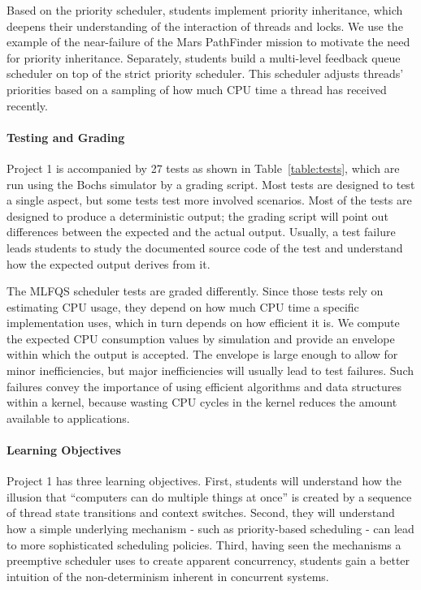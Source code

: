Based on the priority scheduler, students implement priority inheritance, 
which deepens their understanding of the interaction of threads and locks.
We use the example of the near-failure of the Mars PathFinder mission to motivate
the need for priority inheritance.  
Separately, students build a multi-level feedback queue scheduler on top of the strict
priority scheduler.  This scheduler adjusts threads' priorities based on a sampling  
of how much CPU time a thread has received recently.

\paragraph{Testing and Grading}
Project 1 is accompanied by 27 tests as shown in Table~\ref{table:tests}, which are 
run using the Bochs simulator by a grading script.  
Most tests are designed to test a single aspect, but some tests 
test more involved scenarios.  Most of the tests are designed to produce a deterministic 
output; the grading script will point out differences between the expected and the actual output. 
Usually, a test failure leads students to study the documented source code of the test
and understand how the expected output derives from it.

The MLFQS scheduler tests are graded differently. Since those tests rely on estimating CPU
usage, they depend on how much CPU time a specific implementation uses, which in turn depends on how
efficient it is.  We compute the expected CPU consumption values by simulation and provide an
envelope within which the output is accepted.  The envelope is large enough to allow for minor
inefficiencies, but major inefficiencies will usually lead to test failures.  Such failures
convey the importance of using efficient algorithms and data structures within a kernel,
because wasting CPU cycles in the kernel reduces the amount available to applications.

\paragraph{Learning Objectives}
Project 1 has three learning objectives.  First, students will understand how
the illusion that ``computers can do multiple things at once'' is created by a sequence
of thread state transitions and context switches.  Second, they will understand how
a simple underlying mechanism - such as priority-based scheduling - can lead to more
sophisticated scheduling policies.  Third, having seen the mechanisms a preemptive scheduler
uses to create apparent concurrency, students gain a better intuition of the non-determinism
inherent in concurrent systems. 

